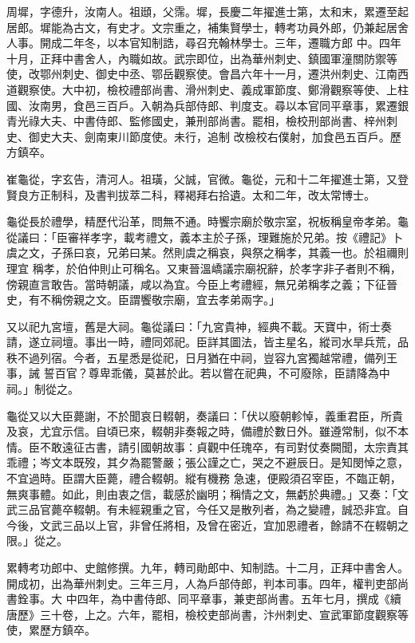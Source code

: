 \begin{pinyinscope}
 周墀，字德升，汝南人。祖頲，父霈。墀，長慶二年擢進士第，太和末，累遷至起居郎。墀能為古文，有史才。文宗重之，補集賢學士，轉考功員外郎，仍兼起居舍人事。開成二年冬，以本官知制誥，尋召充翰林學士。三年，遷職方郎
 中。四年十月，正拜中書舍人，內職如故。武宗即位，出為華州刺史、鎮國軍潼關防禦等使，改鄂州刺史、御史中丞、鄂岳觀察使。會昌六年十一月，遷洪州刺史、江南西道觀察使。大中初，檢校禮部尚書、滑州刺史、義成軍節度、鄭滑觀察等使、上柱國、汝南男，食邑三百戶。入朝為兵部侍郎、判度支。尋以本官同平章事，累遷銀青光祿大夫、中書侍郎、監修國史，兼刑部尚書。罷相，檢校刑部尚書、梓州刺史、御史大夫、劍南東川節度使。未行，追制
 改檢校右僕射，加食邑五百戶。歷方鎮卒。



 崔龜從，字玄告，清河人。祖璜，父誠，官微。龜從，元和十二年擢進士第，又登賢良方正制科，及書判拔萃二科，釋褐拜右拾遺。太和二年，改太常博士。



 龜從長於禮學，精歷代沿革，問無不通。時饗宗廟於敬宗室，祝板稱皇帝孝弟。龜從議曰：「臣審祥孝字，載考禮文，義本主於子孫，理難施於兄弟。按《禮記》卜虞之文，子孫曰哀，兄弟曰某。然則虞之稱哀，與祭之稱孝，其義一也。於祖禰則理宜
 稱孝，於伯仲則止可稱名。又東晉溫嶠議宗廟祝辭，於孝字非子者則不稱，傍親直言敢告。當時朝議，咸以為宜。今臣上考禮經，無兄弟稱孝之義；下征晉史，有不稱傍親之文。臣謂饗敬宗廟，宜去孝弟兩字。」



 又以祀九宮壇，舊是大祠。龜從議曰：「九宮貴神，經典不載。天寶中，術士奏請，遂立祠壇。事出一時，禮同郊祀。臣詳其圖法，皆主星名，縱司水旱兵荒，品秩不過列宿。今者，五星悉是從祀，日月猶在中祠，豈容九宮獨越常禮，備列王事，誡
 誓百官？尊卑乖儀，莫甚於此。若以嘗在祀典，不可廢除，臣請降為中祠。」制從之。



 龜從又以大臣薨謝，不於聞哀日輟朝，奏議曰：「伏以廢朝軫悼，義重君臣，所貴及哀，尤宜示信。自頃已來，輟朝非奏報之時，備禮於數日外。雖遵常制，似不本情。臣不敢遠征古書，請引國朝故事：貞觀中任瑰卒，有司對仗奏闕聞，太宗責其乖禮；岑文本既歿，其夕為罷警嚴；張公謹之亡，哭之不避辰日。是知閔悼之意，不宜過時。臣謂大臣薨，禮合輟朝。縱有機務
 急速，便殿須召宰臣，不臨正朝，無爽事體。如此，則由衷之信，載感於幽明；稱情之文，無虧於典禮。」又奏：「文武三品官薨卒輟朝。有未經親重之官，今任又是散列者，為之變禮，誠恐非宜。自今後，文武三品以上官，非曾任將相，及曾在密近，宜加恩禮者，餘請不在輟朝之限。」從之。



 累轉考功郎中、史館修撰。九年，轉司勛郎中、知制誥。十二月，正拜中書舍人。開成初，出為華州刺史。三年三月，人為戶部侍郎，判本司事。四年，權判吏部尚書銓事。大
 中四年，為中書侍郎、同平章事，兼吏部尚書。五年七月，撰成《續唐歷》三十卷，上之。六年，罷相，檢校吏部尚書，汴州刺史、宣武軍節度觀察等使，累歷方鎮卒。




\end{pinyinscope}
